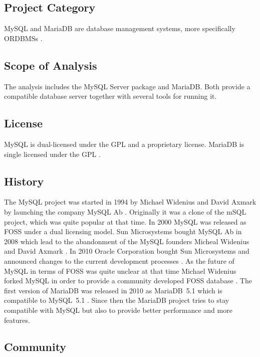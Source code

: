 \subsection{Project Category}

MySQL and MariaDB are database management systems, more specifically
\acp{ORDBMS} \cite{MySQLAbout}.

\subsection{Scope of Analysis}

The analysis includes the MySQL Server package and MariaDB. Both provide a
compatible database server together with several tools for running it.

\subsection{License}

MySQL is dual-licensed under the \ac{GPL} and a proprietary license. MariaDB is
single licensed under the \ac{GPL} \cite{MySQLLicense}.

\subsection{History}

The MySQL project was started in 1994 by Michael Widenius and David Axmark by
launching the company MySQL Ab \cite{MySQLHistory}. Originally it was a clone
of the mSQL project, which was quite popular at that time. In 2000 MySQL was
released as \ac{FOSS} under a dual licensing model. Sun Microsystems bought
MySQL Ab in 2008 which lead to the abandonment of the MySQL founders Micheal
Widenius and David Axmark \cite{MySQLSun}. In 2010 Oracle Corporation bought
Sun Microsystems and announced changes to the current development processes
\cite{MySQLOracle}. As the future of MySQL in terms of \ac{FOSS} was quite
unclear at that time Michael Widenius forked MySQL in order to provide a
community developed \ac{FOSS} database \cite{MySQLBehind}. The first version
of MariaDB was released in 2010 as MariaDB~5.1 which is compatible to MySQL~5.1
\cite{MySQLMariaDB5.1}. Since then the MariaDB project tries to stay compatible
with MySQL but also to provide better performance and more features.

\subsection{Community}

